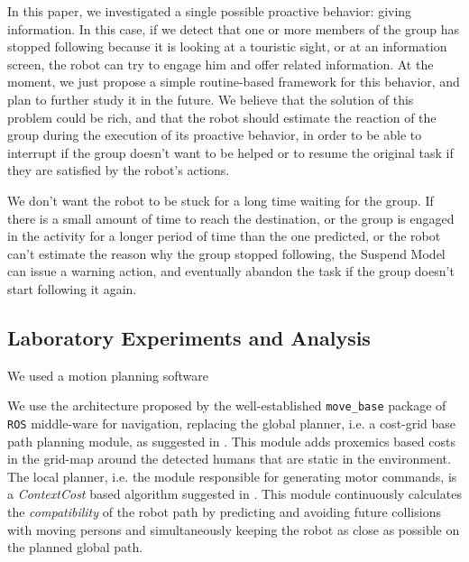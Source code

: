 In this paper, we investigated a single possible proactive behavior: giving information. In this case, if we detect that one or more  members
of the group has stopped following because it is looking at a touristic sight, or at an information screen, the robot can try to engage him and offer related information. At the moment, we just propose a simple routine-based framework for this behavior, and plan to further study it in the future. We believe that the solution of this problem could be rich, and that the robot should estimate the reaction of the group during the execution of its proactive behavior, in order to be able to interrupt if the group doesn't want to be helped or to resume the original task if they are satisfied by the robot's actions.

We don't want the robot to be stuck for a long time  waiting for the group. If there is a small amount of time to reach the destination, or the group is engaged in the activity for a longer period of time than the one predicted, or the robot can't estimate the reason why the group stopped following, the Suspend Model can issue a warning action, and eventually abandon the task if the group doesn't start following it again.





\vspace{-10pt}
\subsection{Laboratory Experiments and Analysis}
We used a motion planning software

We use the architecture proposed by the well-established \verb!move_base! package of \verb!ROS! middle-ware \cite{movebase,ros} for navigation, replacing the global planner, i.e. a cost-grid base path planning module, as suggested in \cite{sisbotTRO2007}. This module adds proxemics based costs in the grid-map around the detected humans that are static in the environment. The local planner, i.e. the module responsible for generating motor commands, is a \textit{ContextCost} based algorithm suggested in \cite{kruse12crossing}. This module continuously calculates the \textit{compatibility} of the robot path by predicting and avoiding future collisions with moving persons and simultaneously keeping the robot as close as possible on the planned global path.

